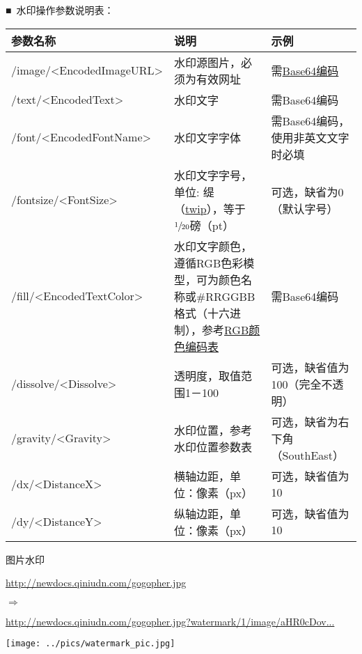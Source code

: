 \documentclass[11pt, oneside]{book}
\newcommand{\qsym}[1]{
\footnotesize
\noindent
#1\par
\normalsize
}
\newcommand{\qpara}[1]{
\vspace{0.3em}
\noindent
#1\par
\vspace{0.3em}
}
\newcommand{\qsamplelink}[1]{
\vspace{0.2em}
\noindent
#1\par
\vspace{0.1em}
}
\newcommand{\qurl}[1]{\footnotesize\url{#1}\normalsize}
\newcommand{\qtable}[1]{\footnotesize\vspace{0.5em}#1\vspace{0.5em}\normalsize}
\begin{document}
\qpara{■\ 水印操作参数说明表：}
\qtable{
\begin{tabular}[t]{|l|p{14em}|p{10em}|}
\hline
参数名称 & 说明 & 示例 \\
\hline
/image/\textless EncodedImageURL\textgreater & 水印源图片，必须为有效网址 & 需\href{http://zh.wikipedia.org/zh-cn/Base64}{Base64编码} \\
\hline
/text/\textless EncodedText\textgreater & 水印文字 & 需Base64编码 \\
\hline
/font/\textless EncodedFontName\textgreater & 水印文字字体 & 需Base64编码，使用非英文文字时必填 \\
\hline
/fontsize/\textless FontSize\textgreater & 水印文字字号，单位: 缇（\href{http://en.wikipedia.org/wiki/Twip}{twip}），等于$\sfrac{1}{20}$磅（pt） & 可选，缺省为0（默认字号） \\
\hline
/fill/\textless EncodedTextColor\textgreater & 水印文字颜色，遵循RGB色彩模型，可为颜色名称或\#RRGGBB格式（十六进制），参考\href{http://www.rapidtables.com/web/color/RGB_Color.htm}{RGB颜色编码表} & 需Base64编码 \\
\hline
/dissolve/\textless Dissolve\textgreater & 透明度，取值范围1－100 & 可选，缺省值为100（完全不透明） \\
\hline
/gravity/\textless Gravity\textgreater & 水印位置，参考水印位置参数表 & 可选，缺省为右下角（SouthEast） \\
\hline
/dx/\textless DistanceX\textgreater & 横轴边距，单位：像素（px） & 可选，缺省值为10 \\
\hline
/dy/\textless DistanceY\textgreater & 纵轴边距，单位：像素（px） & 可选，缺省值为10 \\
\hline
\end{tabular}
}

\begin{sample}
  \caption{图片水印}
    \qsamplelink{\qurl{http://newdocs.qiniudn.com/gogopher.jpg}}
    \qsym{$\Rightarrow$}
    \qsamplelink{\ttfamily\footnotesize\href{http://newdocs.qiniudn.com/gogopher.jpg?watermark/1/image/aHR0cDovL3d3dy5iMS5xaW5pdWRuLmNvbS9pbWFnZXMvbG9nby0yLnBuZw==}{http://newdocs.qiniudn.com/gogopher.jpg?watermark/1/image/aHR0cDov...}\normalsize}

    \begin{center}
      \texttt{[image: ../pics/watermark\_pic.jpg]}
    \end{center}
\end{sample}
\end{document}
